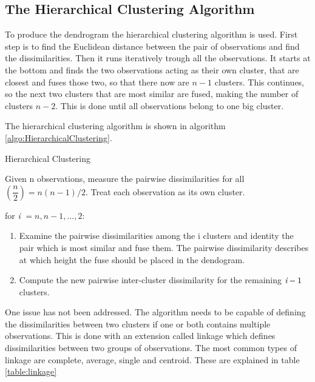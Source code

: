 
\FloatBarrier
\subsection{The Hierarchical Clustering Algorithm}
To produce the dendrogram the hierarchical clustering algorithm is used. First step is to find the Euclidean distance between the pair of observations and find the dissimilarities.
Then it runs iteratively trough all the observations. It starts at the bottom and finds the two observations acting as their own cluster, that are closest and fuses those two, so that there now are $n-1$ clusters. This continues, so the next two clusters that are most similar are fused, making the number of clusters $n-2$. This is done until all observations belong to one big cluster.

The hierarchical clustering algorithm is shown in algorithm \ref{algo:HierarchicalClustering}.

\begin{algorithm}
	\caption{Hierarchical Clustering}
	\label{algo:HierarchicalClustering}
	\begin{algorithmic}[1]
 		\State Given n observations, measure the pairwise dissimilarities for all  $(\dfrac{n}{2}) =n(n-1)/2 $. Treat each observation as its own cluster.
 		
 		\State for \emph{i} $= n,n-1,...,2:$
 		\begin{enumerate}[label=(\alph*)]
 			\item Examine the pairwise dissimilarities among the i clusters and identity the pair which is most similar and fuse them. The pairwise dissimilarity describes at which height the fuse should be placed in the dendogram.
 			\item Compute the new pairwise inter-cluster dissimilarity for the remaining $\emph{i}-1$ clusters.
 		\end{enumerate}
 	\end{algorithmic}
 \end{algorithm}

One issue has not been addressed. The algorithm needs to be capable of defining the dissimilarities between two clusters if one or both contains multiple observations. This is done with an extension called linkage which defines dissimilarities between two groups of observations. The most common types of linkage are complete, average, single and
centroid. These are explained in table \ref{table:linkage}

